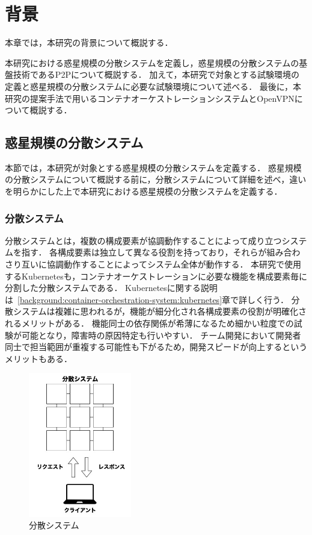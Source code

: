 \chapter{背景}
\label{background}

本章では，本研究の背景について概説する．

本研究における惑星規模の分散システムを定義し，惑星規模の分散システムの基盤技術であるP2Pについて概説する．
加えて，本研究で対象とする試験環境の定義と惑星規模の分散システムに必要な試験環境について述べる．
最後に，本研究の提案手法で用いるコンテナオーケストレーションシステムとOpenVPNについて概説する．

\section{惑星規模の分散システム}
\label{bg:definition}

本節では，本研究が対象とする惑星規模の分散システムを定義する．
惑星規模の分散システムについて概説する前に，分散システムについて詳細を述べ，違いを明らかにした上で本研究における惑星規模の分散システムを定義する．

\subsection{分散システム}
\label{bg:definition:distributed-system}

分散システムとは，複数の構成要素が協調動作することによって成り立つシステムを指す．
各構成要素は独立して異なる役割を持っており，それらが組み合わさり互いに協調動作することによってシステム全体が動作する．
本研究で使用するKubernetesも，コンテナオーケストレーションに必要な機能を構成要素毎に分割した分散システムである．
Kubernetesに関する説明は~\ref{background:container-orchestration-system:kubernetes}章で詳しく行う．
分散システムは複雑に思われるが，機能が細分化され各構成要素の役割が明確化されるメリットがある．
機能同士の依存関係が希薄になるため細かい粒度での試験が可能となり，障害時の原因特定も行いやすい．
チーム開発において開発者同士で担当範囲が重複する可能性も下がるため，開発スピードが向上するというメリットもある．

\begin{figure}[htbp]
\begin{center}
    \includegraphics[width=0.4\textwidth]{./figures/distributed-system.jpg}
    \caption{分散システム}
\end{center}
\end{figure}

